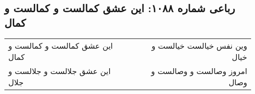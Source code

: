\begin{center}
\section*{رباعی شماره ۱۰۸۸: این عشق کمالست و کمالست و کمال}
\label{sec:1088}
\begin{longtable}{l p{0.5cm} r}
این عشق کمالست و کمالست و کمال
&&
وین نفس خیالست خیالست و خیال
\\
این عشق جلالست و جلالست و جلال
&&
امروز وصالست و وصالست و وصال
\\
\end{longtable}
\end{center}
